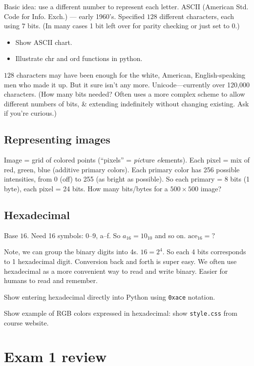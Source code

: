 \documentclass{article}
\begin{document}
Basic idea: use a different number to represent each letter.  ASCII
(American Std. Code for Info. Exch.) --- early 1960's.  Specified
$128$ different characters, each using $7$ bits.  (In many cases 1 bit
left over for parity checking or just set to $0$.)
\begin{itemize}
\item Show ASCII chart.
\item Illustrate chr and ord functions in python.
\end{itemize}
$128$ characters may have been enough for the white, American,
English-speaking men who made it up.  But it sure isn't any more.
Unicode---currently over 120,000 characters. (How many bits needed?
Often uses a more complex scheme to allow different numbers of bits,
\& extending indefinitely without changing existing.  Ask if you're
curious.)

\subsection*{Representing images}

Image = grid of colored points (``pixels'' = \emph{pic}ture
\emph{el}ements).  Each pixel = mix of red, green, blue (additive
primary colors).  Each primary color has 256 possible intensities,
from 0 (off) to 255 (as bright as possible).  So each primary = 8 bits
(1 byte), each pixel = 24 bits.  How many bits/bytes for a $500 \times
500$ image?

\subsection*{Hexadecimal}

Base $16$.  Need 16 symbols: 0--9, a--f. So $a_{16} = 10_{10}$ and so
on. $\mbox{ace}_{16} = ?$

Note, we can group the binary digits into 4s.  $16 = 2^4$.  So each 4
bits corresponds to 1 hexadecimal digit.  Conversion back and forth is
super easy.  We often use hexadecimal as a more convenient way to read
and write binary.  Easier for humans to read and remember.

Show entering hexadecimal directly into Python using \verb|0xace|
notation.

Show example of RGB colors expressed in hexadecimal: show
\verb|style.css| from course website.

\newpage
\section{Exam 1 review}
\end{document}
